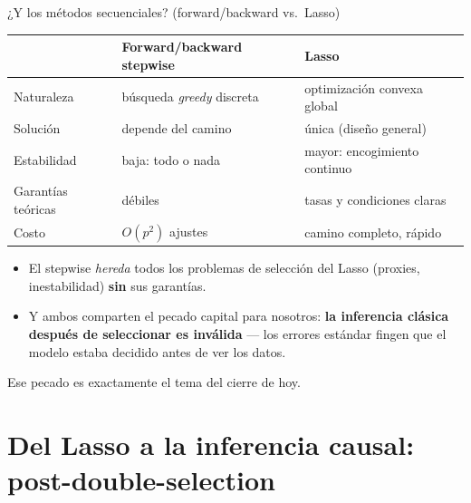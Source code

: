 \documentclass{beamer}
\newcommand{\1}{\mathbb{I}}
\begin{document}
\begin{frame}{¿Y los métodos secuenciales? (forward/backward vs.\ Lasso)}
\small
\begin{center}
\footnotesize
\setlength{\tabcolsep}{4pt}
\begin{tabular}{lll}
\hline
 & Forward/backward stepwise & Lasso \\
\hline
Naturaleza & búsqueda \emph{greedy} discreta & optimización convexa global \\
Solución & depende del camino & única (diseño general) \\
Estabilidad & baja: todo o nada & mayor: encogimiento continuo \\
Garantías teóricas & débiles & tasas y condiciones claras \\
Costo & $O(p^2)$ ajustes & camino completo, rápido \\
\hline
\end{tabular}
\end{center}
\pause

\vspace{0.25cm}
\begin{itemize}\itemsep5pt
  \item El stepwise \emph{hereda} todos los problemas de selección del Lasso (proxies, inestabilidad) \textbf{sin} sus garantías.
  \item Y ambos comparten el pecado capital para nosotros: \textbf{la inferencia clásica después de seleccionar es inválida} --- los errores estándar fingen que el modelo estaba decidido antes de ver los datos.
\end{itemize}
\pause

\vspace{0.1cm}
Ese pecado es exactamente el tema del cierre de hoy.
\end{frame}


\section{Del Lasso a la inferencia causal: post-double-selection}
\begin{frame}[noframenumbering]
\tableofcontents[currentsection]
\end{frame}
\end{document}
